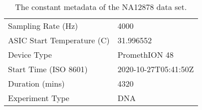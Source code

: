 \begin{table}
    \caption{\label{tab:data-meta}The constant metadata of the NA12878 data set.}
    \begin{tabular}{|l|l|}%
        \hline
	    Sampling Rate (Hz) & 4000\\
	ASIC Start Temperature (\textdegree C) & 31.996552\\
	Device Type & PromethION 48\\
	    Start Time (ISO 8601) & 2020-10-27T05:41:50Z\\
	    Duration (mins) & 4320\\
	    Experiment Type & DNA\\
	\hline
    \end{tabular}
\end{table}
